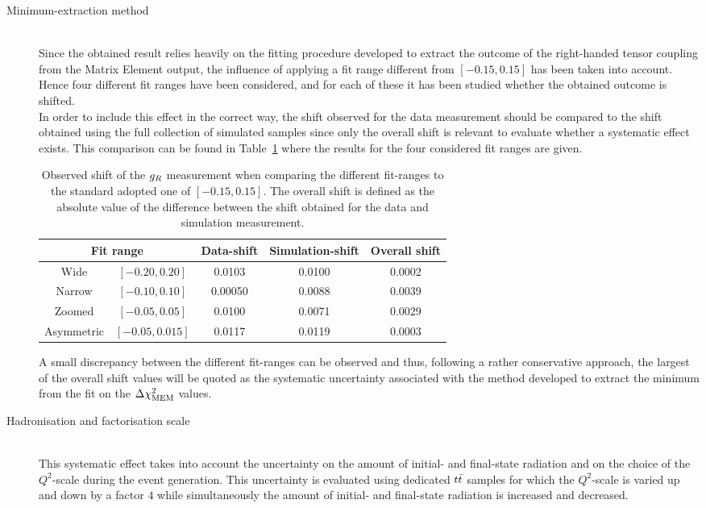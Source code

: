 \begin{myindentpar}
\begin{description}
    \item[Minimum-extraction method] \hfill \\
    Since the obtained result relies heavily on the fitting procedure developed to extract the outcome of the right-handed tensor coupling from the Matrix Element output, the influence of applying a fit range different from $\left[ -0.15, 0.15 \right]$ has been taken into account.
    Hence four different fit ranges have been considered, and for each of these it has been studied whether the obtained outcome is shifted.
    \\
    In order to include this effect in the correct way, the shift observed for the data measurement should be compared to the shift obtained using the full collection of simulated samples since only the overall shift is relevant to evaluate whether a systematic effect exists. This comparison can be found in Table~\ref{table::FitRanges} where the results for the four considered fit ranges are given.
    \begin{table}[h!t]
     \centering
     \caption{Observed shift of the $g_{R}$ measurement when comparing the different fit-ranges to the standard adopted one of $\left[ -0.15, 0.15 \right]$. The overall shift is defined as the absolute value of the difference between the shift obtained for the data and simulation measurement.} \label{table::FitRanges}
     \begin{tabular}{cc|c|c|c}
      \multicolumn{2}{c|}{Fit range}				& Data-shift 	& Simulation-shift 	& Overall shift 	\\
      \hline
      Wide 		& $\left[ -0.20, 0.20 \right]$ 		& 0.0103	& 0.0100		& 0.0002 		\\
      Narrow 		& $\left[ -0.10, 0.10 \right]$ 		& 0.00050 	& 0.0088 		& 0.0039 		\\
      Zoomed 		& $\left[ -0.05, 0.05 \right]$ 		& 0.0100 	& 0.0071 		& 0.0029 		\\
      Asymmetric 	& $\left[ -0.05, 0.015 \right]$ 	& 0.0117 	& 0.0119 		& 0.0003
     \end{tabular}
    \end{table}    
    
    A small discrepancy between the different fit-ranges can be observed and thus, following a rather conservative approach, the largest of the overall shift values will be quoted as the systematic uncertainty associated with the method developed to extract the minimum from the fit on the $\Delta \chi^{2}_{\textrm{MEM}}$ values.
    
    \item[Hadronisation and factorisation scale] \hfill \\
    This systematic effect takes into account the uncertainty on the amount of initial- and final-state radiation and on the choice of the $Q^{2}$-scale during the event generation. This uncertainty is evaluated using dedicated $t\bar{t}$ samples for which the $Q^{2}$-scale is varied up and down by a factor $4$ while simultaneously the amount of initial- and final-state radiation is increased and decreased.
    \\
    

\end{description}
\end{myindentpar}
